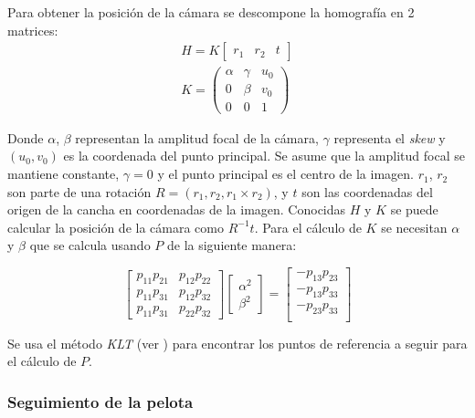 \documentclass[a4paper,10pt]{article}
\begin{document}
Para obtener la posición de la cámara se descompone la homografía en 2 matrices:
\begin{eqnarray*}
H = K \begin{bmatrix} r_1 & r_2 & t \end{bmatrix} \\
K = \begin{pmatrix}
    \alpha & \gamma & u_0 \\
    0 & \beta & v_0 \\
    0 & 0 & 1
    \end{pmatrix}
\end{eqnarray*}

Donde $\alpha$, $\beta$ representan la amplitud focal de la cámara, $\gamma$ representa el \textit{skew} y $(u_0, v_0)$ es la coordenada del punto principal.
Se asume que la amplitud focal se mantiene constante, $\gamma = 0$ y el punto principal es el centro de la imagen.
$r_1$, $r_2$ son parte de una rotación $R = (r_1, r_2, r_1 \times r_2)$, y $t$ son las coordenadas del origen de la cancha en coordenadas de la imagen.
Conocidas $H$ y $K$ se puede calcular la posición de la cámara como $R^{-1} t$.
Para el cálculo de $K$ se necesitan $\alpha$ y $\beta$ que se calcula usando $P$ de la siguiente manera:

\begin{equation}
\begin{bmatrix}
    p_{1 1} p_{2 1} & p_{1 2} p_{2 2} \\
    p_{1 1} p_{3 1} & p_{1 2} p_{3 2} \\
    p_{1 1} p_{3 1} & p_{2 2} p_{3 2}
\end{bmatrix}
\begin{bmatrix}
    \alpha^2 \\
    \beta^2
\end{bmatrix}
 =
\begin{bmatrix}
    - p_{1 3} p_{2 3} \\
    - p_{1 3} p_{3 3} \\
    - p_{2 3} p_{3 3} \\
\end{bmatrix}
\end{equation}

Se usa el método \textit{KLT} (ver \cite{KLT}) para encontrar los puntos de referencia a seguir para el cálculo de $P$.

\subsubsection*{Seguimiento de la pelota}
\end{document}
